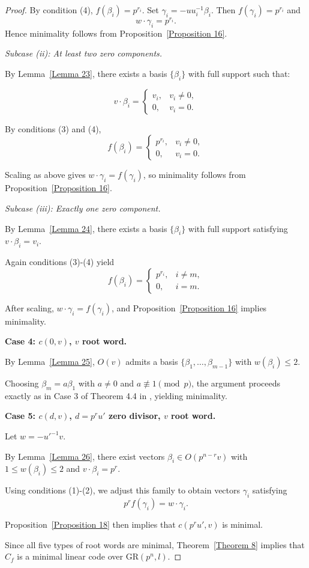 \documentclass[10pt]{article}
\theoremstyle{definition}
\begin{document}
\begin{proof}
By condition (4), $f(\beta_i)=p^{r_i}$.
Set $\gamma_i=-uu_i^{-1}\beta_i$.
Then $f(\gamma_i)=p^{r_i}$ and
\[
w\cdot\gamma_i=p^{r_i}.
\]
Hence minimality follows from Proposition~\ref{Proposition 16}.

\medskip
\noindent
\emph{Subcase (ii): At least two zero components.}

By Lemma~\ref{Lemma 23},
there exists a basis $\{\beta_i\}$
with full support such that:

\[
v\cdot\beta_i=
\begin{cases}
v_i, & v_i\neq 0,\\
0, & v_i=0.
\end{cases}
\]

By conditions (3) and (4),
\[
f(\beta_i)=
\begin{cases}
p^{r_i}, & v_i\neq 0,\\
0, & v_i=0.
\end{cases}
\]

Scaling as above gives
$w\cdot\gamma_i=f(\gamma_i)$,
so minimality follows from Proposition~\ref{Proposition 16}.

\medskip
\noindent
\emph{Subcase (iii): Exactly one zero component.}

By Lemma~\ref{Lemma 24},
there exists a basis $\{\beta_i\}$
with full support satisfying
$v\cdot\beta_i=v_i$.

Again conditions (3)-(4) yield
\[
f(\beta_i)=
\begin{cases}
p^{r_i}, & i\neq m,\\
0, & i=m.
\end{cases}
\]

After scaling,
$w\cdot\gamma_i=f(\gamma_i)$,
and Proposition~\ref{Proposition 16}
implies minimality.

\medskip
\noindent
\textbf{Case 4: $c(0,v)$, $v$ root word.}

By Lemma~\ref{Lemma 25},
$O(v)$ admits a basis
$\{\beta_1,\dots,\beta_{m-1}\}$
with $w(\beta_i)\le 2$.

Choosing $\beta_m=a\beta_1$
with $a\neq 0$ and $a\not\equiv 1\pmod p$,
the argument proceeds exactly as in
Case 3 of Theorem 4.4 in \cite{WuLuCao},
yielding minimality.

\medskip
\noindent
\textbf{Case 5: $c(d,v)$, $d=p^ru'$ zero divisor, $v$ root word.}

Let $w=-u'^{-1}v$.

By Lemma~\ref{Lemma 26},
there exist vectors $\beta_i\in O(p^{n-r}v)$
with $1\le w(\beta_i)\le 2$ and
$v\cdot\beta_i=p^r$.

Using conditions (1)-(2),
we adjust this family to obtain
vectors $\gamma_i$ satisfying
\[
p^r f(\gamma_i)=w\cdot\gamma_i.
\]

Proposition~\ref{Proposition 18}
then implies that $c(p^ru',v)$ is minimal.

\medskip

Since all five types of root words are minimal,
Theorem~\ref{Theorem 8} implies that
$C_f$ is a minimal linear code over $\mathrm{GR}(p^n,l)$.
\end{proof}
\end{document}
